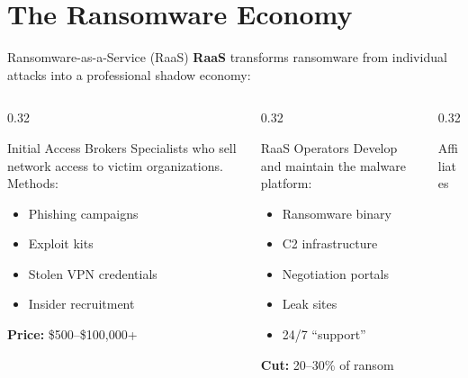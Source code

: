 \documentclass[aspectratio=169]{beamer}
\begin{document}
\section{The Ransomware Economy}

\begin{frame}{Ransomware-as-a-Service (RaaS)}
  \textbf{RaaS} transforms ransomware from individual attacks into a \alert{professional shadow economy}:

  \vspace{0.5em}
  \begin{columns}[T]
    \begin{column}{0.32\textwidth}
      \begin{block}{Initial Access Brokers}
        \footnotesize
        Specialists who sell network access to victim organizations. Methods:
        \begin{itemize}
          \item Phishing campaigns
          \item Exploit kits
          \item Stolen VPN credentials
          \item Insider recruitment
        \end{itemize}
        \textbf{Price:} \$500--\$100,000+
      \end{block}
    \end{column}
    \begin{column}{0.32\textwidth}
      \begin{block}{RaaS Operators}
        \footnotesize
        Develop and maintain the malware platform:
        \begin{itemize}
          \item Ransomware binary
          \item C2 infrastructure
          \item Negotiation portals
          \item Leak sites
          \item 24/7 ``support''
        \end{itemize}
        \textbf{Cut:} 20--30\% of ransom
      \end{block}
    \end{column}
    \begin{column}{0.32\textwidth}
      \begin{block}{Affiliates}

\end{block}
\end{column}
\end{columns}
\end{frame}
\end{document}
